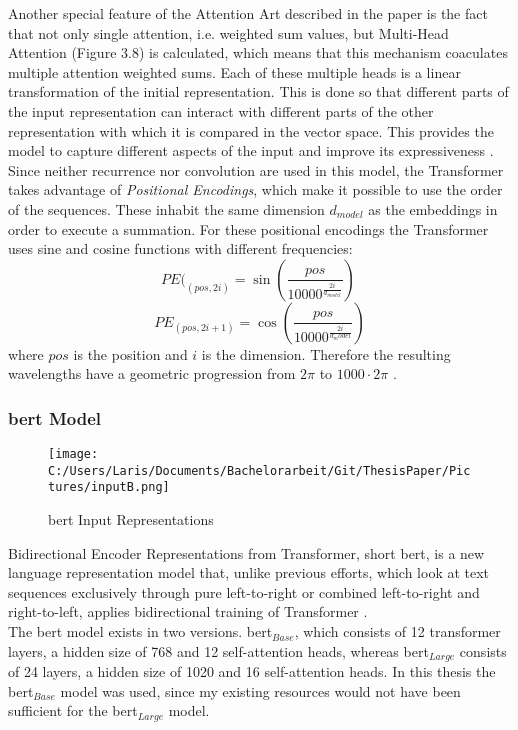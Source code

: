 \documentclass[a4paper, 11pt,titlepage,oneside,openany]{book}
\begin{document}
\indent Another special feature of the Attention Art described in the paper is the fact that not only single attention, i.e. weighted sum values, but Multi-Head Attention (Figure 3.8) is calculated, which means that this mechanism coaculates multiple attention weighted sums. Each of these multiple heads is a linear transformation of the initial representation. This is done so that different parts of the input representation can interact with different parts of the other representation with which it is compared in the vector space. This provides the model to capture different aspects of the input and improve its expressiveness \cite{attention}.\\

\indent Since neither recurrence nor convolution are used in this model, the Transformer takes advantage of \textit{Positional Encodings}, which make it possible to use the order of the sequences. These inhabit the same  dimension $d_{model}$ as the embeddings in order to execute a summation. For these positional encodings the Transformer uses sine and cosine functions with different frequencies:
\[
PE(_{(pos,2i)}=\sin (\frac{pos}{10000^{\frac{2i}{d_{model}}}})
\
\]
\[
PE_{(pos,2i+1)}=\cos (\frac{pos}{10000^{\frac{2i}{d_model}}})
\]
where $pos$ is the position and $i$ is the dimension. Therefore the resulting wavelengths have a geometric progression from $2\pi$ to $1000 \cdot 2\pi$ \cite{attention}.

\newpage
\subsubsection{\gls{bert} Model}
\begin{figure}[h]
	\centering
	\texttt{[image: C:/Users/Laris/Documents/Bachelorarbeit/Git/ThesisPaper/Pictures/inputB.png]}
	\caption{\gls{bert} Input Representations \cite{bert}}
\end{figure}
\noindent Bidirectional Encoder Representations from Transformer, short \gls{bert}, is a new language representation model that, unlike previous efforts, which look at text sequences exclusively through pure left-to-right or combined left-to-right and right-to-left, applies bidirectional training of Transformer \cite{bert}. \\
\noindent The \gls{bert} model exists in two versions. \gls{bert}$_{Base}$, which consists of 12 transformer layers, a hidden size of 768 and 12 self-attention heads, whereas \gls{bert}$_{Large}$ consists of 24 layers, a hidden size of 1020 and 16 self-attention heads. In this thesis the \gls{bert}$_{Base}$ model was used, since my existing resources would not have been sufficient for the \gls{bert}$_{Large}$ model.\\
\end{document}
